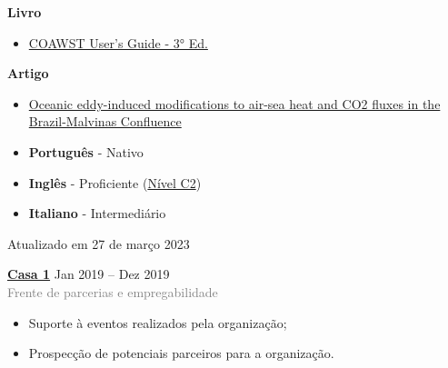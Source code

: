 \documentclass[9pt]{developercv} %
\begin{document}
\begin{minipage}[t]{0.3\textwidth}
	\vspace{-\baselineskip} %
	
	
	\textbf{Livro} %
	\textcolor{gray}{}
	 \begin{itemize}
		\item \small\textcolor{bleu_cite}{\href{http://mtc-m21c.sid.inpe.br/col/sid.inpe.br/mtc-m21c/2020/10.02.15.11/doc/publicacao.pdf}{COAWST User's Guide - 3° Ed.}}
	 \end{itemize}
	 \textbf{Artigo}
	 \begin{itemize}
		\item \small\textcolor{bleu_cite}{\href{https://www.nature.com/articles/s41598-021-89985-9}{Oceanic eddy-induced modifications to air-sea heat and CO2 fluxes in the Brazil-Malvinas Confluence}}
	 \end{itemize}  
\end{minipage}
\hfill
\begin{minipage}[t]{0.3\textwidth}
	\vspace{-\baselineskip} %

	\vspace{-0.3cm}
	\begin{itemize}
	\itemsep0em
	\item \textbf{Português} - Nativo
	\item \textbf{Inglês} - Proficiente (\href{https://www.efset.org/cert/PrWqbW}{\textcolor{bleu_cite}{Nível C2}})
	\item \textbf{Italiano} - Intermediário 
	\end{itemize}
	\vspace{1,7cm}
	
	\centering\tiny Atualizado em 27 de março 2023
\end{minipage}
\hfill
\begin{minipage}[t]{0.3\textwidth}
	\vspace{-\baselineskip} %


	\textbf{\textcolor{bleu_cite}{\href{https://www.casaum.org/}{Casa 1}} } \hspace{1.cm} Jan 2019 --  Dez 2019\\
	\textcolor{gray}{Frente de parcerias e empregabilidade}
	\begin{itemize}
		\item Suporte à eventos realizados pela organização;
		\item Prospecção de potenciais parceiros para a organização.
	\end{itemize}
\end{minipage}


\end{document}

